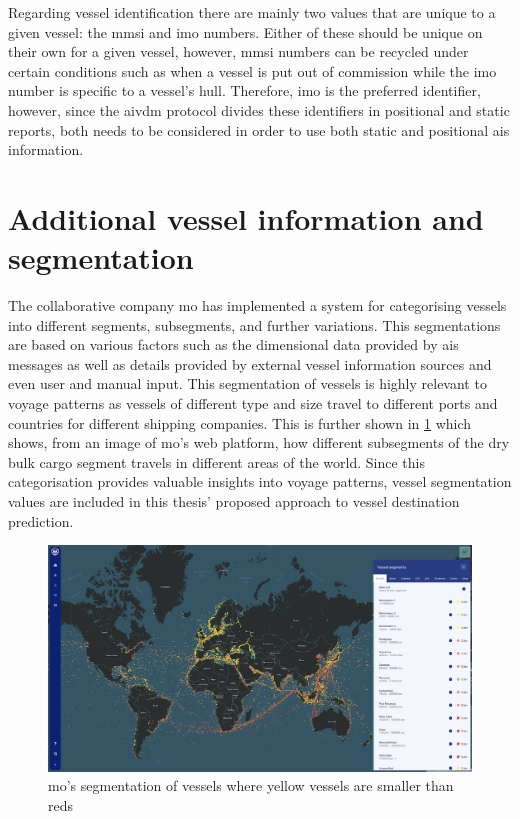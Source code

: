 Regarding vessel identification there are mainly two values that are unique to a given vessel: the \acrshort{mmsi} and \acrshort{imo} numbers. Either of these should be unique on their own for a given vessel, however, \acrshort{mmsi} numbers can be recycled under certain conditions such as when a vessel is put out of commission while the \acrshort{imo} number is specific to a vessel's hull. Therefore, \acrshort{imo} is the preferred identifier, however, since the \gls{aivdm} protocol divides these identifiers in positional and static reports, both needs to be considered in order to use both static and positional \acrshort{ais} information.

\section{Additional vessel information and segmentation}

The collaborative company \acrfull{mo} has implemented a system for categorising vessels into different segments, subsegments, and further variations. This segmentations are based on various factors such as the dimensional data provided by \acrshort{ais} messages as well as details provided by external vessel information sources and even user and manual input. This segmentation of vessels is highly relevant to voyage patterns as vessels of different type and size travel to different ports and countries for different shipping companies. This is further shown in \cref{fig:segment_map} which shows, from an image of \acrshort{mo}'s web platform, how different subsegments of the dry bulk cargo segment travels in different areas of the world. Since this categorisation provides valuable insights into voyage patterns, vessel segmentation values are included in this thesis' proposed approach to vessel destination prediction.

\begin{figure}[htbp]  %
    \centering
    \includegraphics[width=1.0\textwidth]{figures/segment_map}
    \caption{\acrfull{mo}’s segmentation of vessels where yellow vessels are smaller than reds}
    \label{fig:segment_map}
\end{figure}

